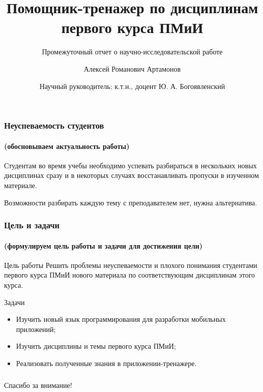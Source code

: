 \documentclass[hyperref={unicode}]{beamer}
\title[%
    Помощник-тренажер
]{%
    Помощник-тренажер по дисциплинам\\ 
    первого курса ПМиИ
}
\subtitle{Промежуточный отчет о научно-исследовательской работе}
\author[%
    Алексей Артамонов
]{%
    Алексей Романович Артамонов
}
\date[%
    --.--.2024
]{%
    Научный руководитель: к.т.н., доцент Ю. А. Богоявленский
}
\institute[%
    ПетрГУ
]{%
    Петрозаводский государственный университет\\
    Кафедра информатики и математического обеспечения
}
\begin{document}
\begin{frame}
\maketitle
\end{frame}

\begin{frame}
  \frametitle{Неуспеваемость студентов}
  \framesubtitle{(обосновываем актуальность работы)}
   Студентам во время учебы необходимо успевать разбираться в нескольких новых дисциплинах сразу и в некоторых случаях восстанавливать пропуски в изученном материале.
  
  Возможности разбирать каждую тему с преподавателем нет, нужна альтернатива.
\end{frame}

\begin{frame}
  \frametitle{Цель и задачи}
  \framesubtitle{(формулируем цель работы и задачи для достижения цели)}
  \begin{block}{Цель работы}
    Решить проблемы неуспеваемости и плохого понимания студентами первого курса ПМиИ 
    нового материала по соответствующим дисциплинам этого курса.
  \end{block}
  \begin{block}{Задачи}
  \begin{itemize}
    \item Изучить новый язык программирования для разработки мобильных приложений;
    \item Изучить дисциплины и темы первого курса ПМиИ;
    \item Реализовать полученные знания в приложении-тренажере.
  \end{itemize}
  \end{block}
\end{frame}

\begin{frame}
  \frametitle{}
  
{\Large\mbox{}\hfil Спасибо за внимание!}
  
\end{frame}
\end{document}
